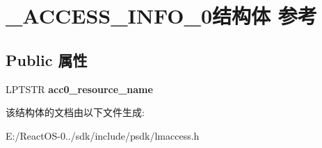 \hypertarget{struct___a_c_c_e_s_s___i_n_f_o__0}{}\section{\+\_\+\+A\+C\+C\+E\+S\+S\+\_\+\+I\+N\+F\+O\+\_\+0结构体 参考}
\label{struct___a_c_c_e_s_s___i_n_f_o__0}
\subsection*{Public 属性}
\begin{DoxyCompactItemize}
\item 
\mbox{\label{struct___a_c_c_e_s_s___i_n_f_o__0_a736ab2983862fe7dafdf99d2537cee6c}} 
L\+P\+T\+S\+TR {\bfseries acc0\+\_\+resource\+\_\+name}
\end{DoxyCompactItemize}


该结构体的文档由以下文件生成\+:\begin{DoxyCompactItemize}
\item 
E\+:/\+React\+O\+S-\/0../sdk/include/psdk/lmaccess.\+h\end{DoxyCompactItemize}
